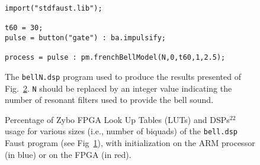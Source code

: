 \documentclass{article}
\title{\papertitle}
\newcommand{\F}{{\sc Faust}}
\begin{document}

\begin{figure}
\begin{boxedminipage}{\columnwidth}
  \tiny
\begin{verbatim}
import("stdfaust.lib");

t60 = 30;
pulse = button("gate") : ba.impulsify;

process = pulse : pm.frenchBellModel(N,0,t60,1,2.5);
\end{verbatim}
\end{boxedminipage}
\caption{The {\tt bellN.dsp} program used to produce the results presented of Fig.~\ref{fig:init}. {\tt N} should be replaced by an integer value indicating the number of resonant filters used to provide the bell sound.}
\label{fig:bell}
\end{figure}

\begin{figure} 
\centering
{}
\caption{Percentage of Zybo FPGA Look Up Tables (LUTs) and DSPs$^{22}$ usage for various sizes (i.e., number of biquads) of the {\tt bell.dsp} \F{} program (see Fig~\ref{fig:bell}), with initialization on the ARM processor (in blue) or on the FPGA (in red).}
\label{fig:init}
\end{figure}

\begin{table}
  \centering
  
  \caption{Latency (in FPGA sys\_clock cycles) of one sample computation for the experiments shown on Fig.~\ref{fig:init}. Should be less that 2500 (at 48kHz). In practice, v6.1 ``works'' (i.e. make a bell sound, with ``crachotements'') up to N=15 and nothing after, no problem with v6.3}
  \label{tab:latency}
\end{table}
\end{document}
